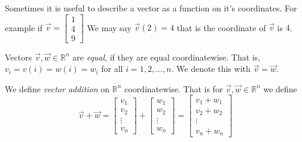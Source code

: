 \begin{remark}
Sometimes it is useful to describe a vector as a function on it's coordinates. 
For example if 
$\vec{v}=\begin{bmatrix}1 \\ 4 \\ 9 \end{bmatrix}$ We may say 
$\vec{v}(2)=4$ that is the  coordinate of $\vec{v}$ is $4$.
\end{remark}


\begin{definition}
Vectors $\vec{v}, \vec{w} \in \mathbb{R}^n$ are \emph{equal},  if they are equal 
coordinatewise. That is, $v_i=v(i)=w(i)=w_i$ for all $i=1,2,\ldots, n$. We 
denote this with  $\vec{v}=\vec{w}$.
\end{definition}


\begin{definition}
We define \emph{vector addition} on $\mathbb{R}^n$ coordinatewise. That is for 
$\vec{v},\vec{w} \in \mathbb{R}^n$ we define
\[
\vec{v}+\vec{w}=
\begin{bmatrix}v_1\\ v_2 \\ \vdots \\ v_n\end{bmatrix}+
\begin{bmatrix}w_1\\ w_2 \\ \vdots \\ w_n\end{bmatrix}=
\begin{bmatrix}v_1+w_1\\ v_2+w_2 \\ \vdots \\ v_n+w_n\end{bmatrix}
\]
\end{definition}

